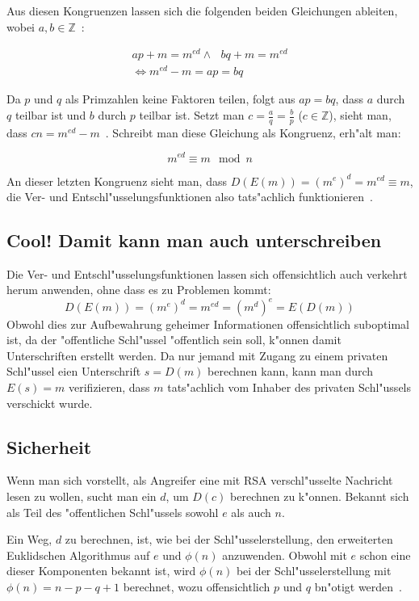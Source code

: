 \documentclass[12pt]{article}
\begin{document}
Aus diesen Kongruenzen lassen sich die folgenden beiden Gleichungen ableiten,
wobei $a, b \in \mathbb{Z}$~\cite{pii1}:

\[
\begin{aligned}
ap + m = m^{ed} \land ~~~ bq + m = m^{ed} \\
\iff m^{ed} - m = ap = bq
\end{aligned}
\]

Da $p$ und $q$ als Primzahlen keine Faktoren teilen, folgt aus $ap = bq$,
dass $a$ durch $q$ teilbar ist und $b$ durch $p$ teilbar ist.
Setzt man $c = \frac{a}{q} = \frac{b}{p}$ ($c \in \mathbb{Z}$),
sieht man, dass $cn = m^{ed} - m$~\cite{pii1}.
Schreibt man diese Gleichung als Kongruenz, erh"alt man:

\[
m^{ed} \equiv m \mod n
\]

An dieser letzten Kongruenz sieht man, dass $D(E(m)) = (m^e)^d = m^{ed} \equiv m$,
die Ver- und Entschl"usselungsfunktionen also tats"achlich funktionieren~\cite{rsa}.

\subsection{Cool! Damit kann man auch unterschreiben}

Die Ver- und Entschl"usselungsfunktionen lassen sich offensichtlich
auch verkehrt herum anwenden, ohne dass es zu Problemen kommt:
\[D(E(m)) = (m^e)^d = m^{ed} = (m^d)^e = E(D(m))\]
Obwohl dies zur Aufbewahrung geheimer Informationen offensichtlich suboptimal ist,
da der "offentliche Schl"ussel "offentlich sein soll, k"onnen damit Unterschriften erstellt werden.
Da nur jemand mit Zugang zu einem privaten Schl"ussel eien Unterschrift $s = D(m)$ berechnen kann,
kann man durch $E(s) = m$ verifizieren, dass $m$ tats"achlich vom
Inhaber des privaten Schl"ussels verschickt wurde.

\subsection{Sicherheit}

Wenn man sich vorstellt, als Angreifer eine mit RSA verschl"usselte Nachricht
lesen zu wollen, sucht man ein $d$, um $D(c)$ berechnen zu k"onnen.
Bekannt sich als Teil des "offentlichen Schl"ussels sowohl $e$ als auch $n$.

Ein Weg, $d$ zu berechnen, ist, wie bei der Schl"usselerstellung,
den erweiterten Euklidschen Algorithmus auf $e$ und $\phi(n)$ anzuwenden.
Obwohl mit $e$ schon eine dieser Komponenten bekannt ist, wird $\phi(n)$
bei der Schl"usselerstellung mit $\phi(n) = n - p - q + 1$ berechnet,
wozu offensichtlich $p$ und $q$ bn"otigt werden~\cite{rsa}.
\end{document}
